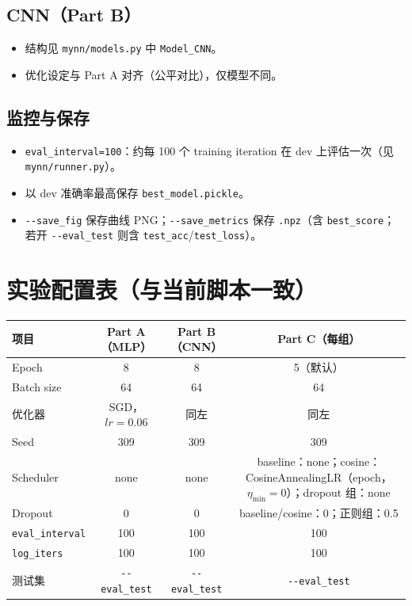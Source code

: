 \documentclass[UTF8,a4paper]{ctexart}
\begin{document}
\subsection{CNN（Part B）}
\begin{itemize}
  \item 结构见 \texttt{mynn/models.py} 中 \texttt{Model\_CNN}。
  \item 优化设定与 Part A 对齐（公平对比），仅模型不同。
\end{itemize}

\subsection{监控与保存}
\begin{itemize}
  \item \texttt{eval\_interval=100}：约每 100 个 training iteration 在 dev 上评估一次（见 \texttt{mynn/runner.py}）。
  \item 以 dev 准确率最高保存 \texttt{best\_model.pickle}。
  \item \texttt{-{}-save\_fig} 保存曲线 PNG；\texttt{-{}-save\_metrics} 保存 \texttt{.npz}（含 \texttt{best\_score}；若开 \texttt{-{}-eval\_test} 则含 \texttt{test\_acc}/\texttt{test\_loss}）。
\end{itemize}

\section{实验配置表（与当前脚本一致）}
\begin{table}[htbp]
  \centering
  \small
  \begin{tabular}{lccc}
    \toprule
    项目 & Part A（MLP） & Part B（CNN） & Part C（每组） \\
    \midrule
    Epoch & 8 & 8 & 5（默认） \\
    Batch size & 64 & 64 & 64 \\
    优化器 & SGD，$lr{=}0.06$ & 同左 & 同左 \\
    Seed & 309 & 309 & 309 \\
    Scheduler & none & none & baseline：none；cosine：CosineAnnealingLR（epoch，$\eta_{\min}{=}0$）；dropout 组：none \\
    Dropout & 0 & 0 & baseline/cosine：0；正则组：0.5 \\
    \texttt{eval\_interval} & 100 & 100 & 100 \\
    \texttt{log\_iters} & 100 & 100 & 100 \\
    测试集 & \texttt{-{}-eval\_test} & \texttt{-{}-eval\_test} & \texttt{-{}-eval\_test} \\
    \bottomrule
  \end{tabular}
\end{table}
\end{document}
